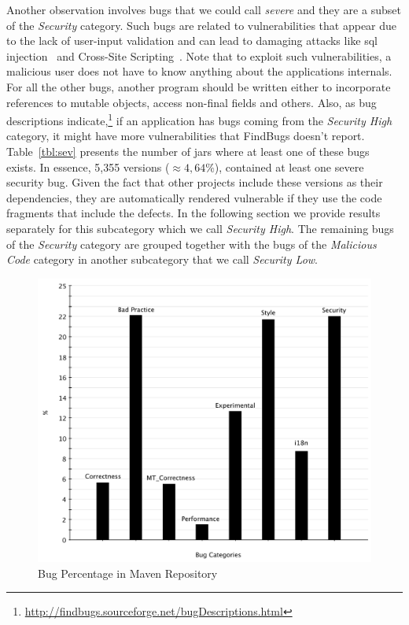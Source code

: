 \documentclass[conference]{llncs}
\begin{document}
Another observation involves bugs that we could call {\it
severe} and they are a subset of the {\it Security} category.
Such bugs are related to vulnerabilities that appear due to the lack of user-input
validation and can lead to damaging attacks like {\sc sql} injection~\cite{RL12} and
Cross-Site Scripting~\cite{WS08}.
Note that to exploit such vulnerabilities, a malicious user does
not have to know anything about the applications internals. For all the other
bugs, another program should be written either to incorporate references to
mutable objects, access non-final fields and others.
Also, as bug descriptions indicate,\footnote{\url{http://findbugs.sourceforge.net/bugDescriptions.html}}
if an application has bugs coming from the {\it Security High} category,
it might have more vulnerabilities that FindBugs doesn't report.
Table~\ref{tbl:sev} presents the number
of {\sc jar}s where at least one of these bugs exists. In essence, 5,355 versions
($\approx 4,64\% $), contained at
least one severe security bug. Given the fact that other projects include these
versions as their dependencies, they are automatically rendered vulnerable if
they use the code fragments that include the defects.
In the following section
we provide results separately for this subcategory which we call {\it Security High}.
The remaining bugs of the {\it Security} category
are grouped together with the bugs of the {\it Malicious Code} category
in another subcategory that we call {\it Security Low}.

\begin{figure}
	\centering
	\includegraphics[scale=0.6]{bug_percent}
	\caption{Bug Percentage in Maven Repository}
	\label{fig:bug-per} 
\end{figure}
\end{document}
